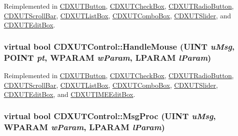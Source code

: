 Reimplemented in \hyperlink{class_c_d_x_u_t_button_ae8da8eb3729b62ac3651eeca42d72530}{CDXUTButton}, \hyperlink{class_c_d_x_u_t_check_box_a6e37b9b6be8e2c13df2927c1cf3d63ef}{CDXUTCheckBox}, \hyperlink{class_c_d_x_u_t_radio_button_a221492c2a117d1faaab749c1f3a88a4d}{CDXUTRadioButton}, \hyperlink{class_c_d_x_u_t_scroll_bar_a07c561820f6f3362f94a391c7ff58b04}{CDXUTScrollBar}, \hyperlink{class_c_d_x_u_t_list_box_a20b2dc81c2af1206a21b19f46f8300a4}{CDXUTListBox}, \hyperlink{class_c_d_x_u_t_combo_box_abe59d59e89767472038d69260ef73f9d}{CDXUTComboBox}, \hyperlink{class_c_d_x_u_t_slider_a964f84282a049232a0620eaa58242fd2}{CDXUTSlider}, and \hyperlink{class_c_d_x_u_t_edit_box_a579bcc8298d08c9d52fbf917fa046442}{CDXUTEditBox}.\hypertarget{class_c_d_x_u_t_control_a263979b3221cb7a44b4caea72366c335}{
\subsubsection[{HandleMouse}]{\setlength{\rightskip}{0pt plus 5cm}virtual bool CDXUTControl::HandleMouse (UINT {\em uMsg}, \/  POINT {\em pt}, \/  WPARAM {\em wParam}, \/  LPARAM {\em lParam})}}
\label{class_c_d_x_u_t_control_a263979b3221cb7a44b4caea72366c335}


Reimplemented in \hyperlink{class_c_d_x_u_t_button_ac0bb3da0b5cc77e4cadfbbed72d3e5b7}{CDXUTButton}, \hyperlink{class_c_d_x_u_t_check_box_a4638ad4bb74d1a5fae3ba2b8b01072d6}{CDXUTCheckBox}, \hyperlink{class_c_d_x_u_t_radio_button_aab0a615727913f7f6c8e8d35cc2220e6}{CDXUTRadioButton}, \hyperlink{class_c_d_x_u_t_scroll_bar_aa0c2286530836c1ed431dea5760280da}{CDXUTScrollBar}, \hyperlink{class_c_d_x_u_t_list_box_a7d184abbad5688513f0fb25d6a37528f}{CDXUTListBox}, \hyperlink{class_c_d_x_u_t_combo_box_a1cc659081f04fdf657f644d9970a7df8}{CDXUTComboBox}, \hyperlink{class_c_d_x_u_t_slider_a20c8e1a621cc1a18f0535f5fd4bbd273}{CDXUTSlider}, \hyperlink{class_c_d_x_u_t_edit_box_afadff4a882c187926a7b8173eb7d97cc}{CDXUTEditBox}, and \hyperlink{class_c_d_x_u_t_i_m_e_edit_box_a02795ef1096e7a276afdc501c606eab9}{CDXUTIMEEditBox}.\hypertarget{class_c_d_x_u_t_control_a58d0d118146c8853a7ccd27da9e3fcf3}{
\subsubsection[{MsgProc}]{\setlength{\rightskip}{0pt plus 5cm}virtual bool CDXUTControl::MsgProc (UINT {\em uMsg}, \/  WPARAM {\em wParam}, \/  LPARAM {\em lParam})}}
\label{class_c_d_x_u_t_control_a58d0d118146c8853a7ccd27da9e3fcf3}


